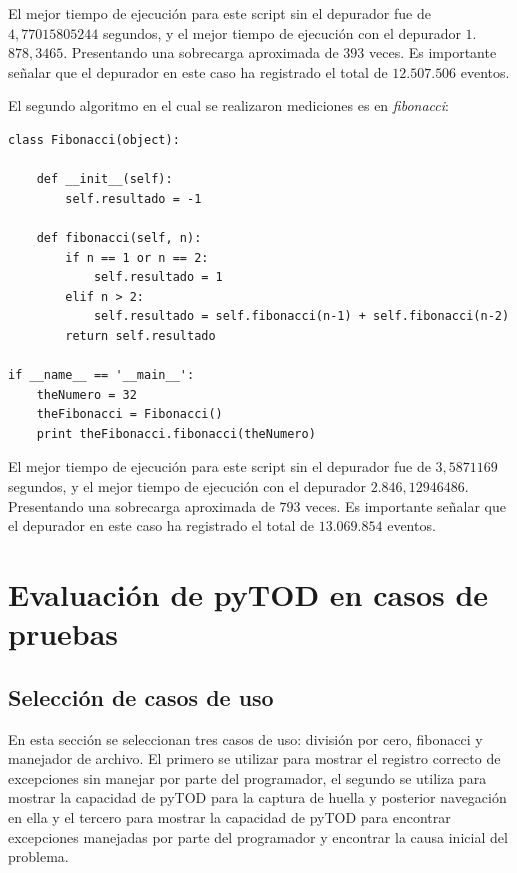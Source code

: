 \documentclass[12pt,legalpaper]{report}
\begin{document}
El mejor tiempo de ejecución para este script sin el depurador fue de $4,77015805244$ segundos, y el mejor tiempo de ejecución con el depurador $1$.$878,3465$.  Presentando una sobrecarga aproximada de $393$ veces. Es importante señalar que el depurador en este caso ha registrado el total de $12$.$507$.$506$ eventos.

El segundo algoritmo en el cual se realizaron mediciones es en \textit{fibonacci}:

\begin{singlespace}
\begin{lstlisting}[style=Python]
class Fibonacci(object):
    
    def __init__(self):
        self.resultado = -1
        
    def fibonacci(self, n):
        if n == 1 or n == 2:
            self.resultado = 1
        elif n > 2:
            self.resultado = self.fibonacci(n-1) + self.fibonacci(n-2)
        return self.resultado

if __name__ == '__main__':
    theNumero = 32
    theFibonacci = Fibonacci()
    print theFibonacci.fibonacci(theNumero)
\end{lstlisting}
\end{singlespace}	

El mejor tiempo de ejecución para este script sin el depurador fue de $3,5871169$ segundos, y el mejor tiempo de ejecución con el depurador $2$.$846,12946486$.  Presentando una sobrecarga aproximada de $793$ veces.  Es importante señalar que el depurador en este caso ha registrado el total de $13$.$069$.$854$ eventos.
	
\chapter{Evaluación de pyTOD en casos de pruebas}
	\section{Selección de casos de uso}

En esta sección se seleccionan tres casos de uso: división por cero, fibonacci y manejador de archivo.  El primero se utilizar para mostrar el registro correcto de excepciones sin manejar por parte del programador, el segundo se utiliza para mostrar la capacidad de pyTOD para la captura de huella y posterior navegación en ella y el tercero para mostrar la capacidad de pyTOD para encontrar excepciones manejadas por parte del programador y encontrar la causa inicial del problema.
\end{document}

